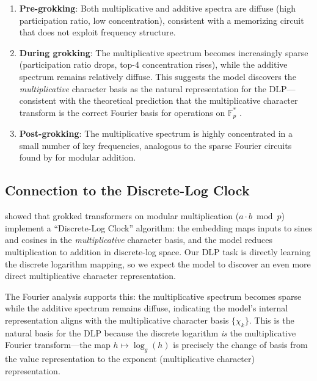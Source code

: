 \documentclass[11pt]{article}
\newcommand{\Fps}{\mathbb{F}_p^*}
\begin{document}
\begin{enumerate}[leftmargin=*]
    \item \textbf{Pre-grokking}: Both multiplicative and additive spectra are diffuse (high participation ratio, low concentration), consistent with a memorizing circuit that does not exploit frequency structure.
    
    \item \textbf{During grokking}: The multiplicative spectrum becomes increasingly sparse (participation ratio drops, top-4 concentration rises), while the additive spectrum remains relatively diffuse. This suggests the model discovers the \emph{multiplicative} character basis as the natural representation for the DLP---consistent with the theoretical prediction that the multiplicative character transform is the correct Fourier basis for operations on $\Fps$ \citep{doshi2024discrete}.
    
    \item \textbf{Post-grokking}: The multiplicative spectrum is highly concentrated in a small number of key frequencies, analogous to the sparse Fourier circuits found by \citet{nanda2023progress} for modular addition.
\end{enumerate}

\subsection{Connection to the Discrete-Log Clock}

\citet{doshi2024discrete} showed that grokked transformers on modular multiplication ($a \cdot b \bmod p$) implement a ``Discrete-Log Clock'' algorithm: the embedding maps inputs to sines and cosines in the \emph{multiplicative} character basis, and the model reduces multiplication to addition in discrete-log space. Our DLP task is directly learning the discrete logarithm mapping, so we expect the model to discover an even more direct multiplicative character representation.

The Fourier analysis supports this: the multiplicative spectrum becomes sparse while the additive spectrum remains diffuse, indicating the model's internal representation aligns with the multiplicative character basis $\{\chi_k\}$. This is the natural basis for the DLP because the discrete logarithm \emph{is} the multiplicative Fourier transform---the map $h \mapsto \log_g(h)$ is precisely the change of basis from the value representation to the exponent (multiplicative character) representation.
\end{document}
